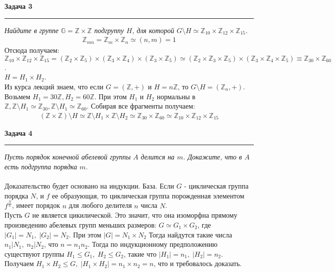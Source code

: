 \documentclass[a4paper,11pt]{article}
\begin{document}
\textbf{\large Задача 3}
\medskip\hrule\medskip
\textit{Найдите в группе $ \mathbb{G} = \mathbb{Z} \times \mathbb{Z} $ подгруппу $ H $, для которой $ G \setminus H \simeq \mathbb{Z}_{10} \times \mathbb{Z}_{12} \times \mathbb{Z}_{15} $.} \\
\begin{gather*}
\mathbb{Z}_{mn} = \mathbb{Z}_{m} \times \mathbb{Z}_{n} \simeq (n, m) = 1
\end{gather*}
Отсюда получаем: $ \mathbb{Z}_{10} \times \mathbb{Z}_{12} \times \mathbb{Z}_{15} = (\mathbb{Z}_{2} \times \mathbb{Z}_{5}) \times (\mathbb{Z}_{3} \times \mathbb{Z}_{4}) \times (\mathbb{Z}_{3} \times \mathbb{Z}_{5}) \simeq (\mathbb{Z}_{2} \times \mathbb{Z}_{3} \times \mathbb{Z}_{5}) \times (\mathbb{Z}_{3} \times \mathbb{Z}_{4} \times \mathbb{Z}_{5}) \equiv \mathbb{Z}_{30} \times \mathbb{Z}_{60} $.   \\[2pt]
$ H = H_1 \times H_2 $. \\[2pt]
Из курса лекций знаем, что если $ G = (\mathbb{Z}, +) $ и $ H = n\mathbb{Z} $, то  $ G \setminus H = (\mathbb{Z}_n, +)$. \\[2pt]
Возьмем $ H_1 = 30\mathbb{Z}, H_2 = 60\mathbb{Z} $. При этом $ H_1 $ и $ H_2 $ нормальны в $ \mathbb{Z}, \mathbb{Z} \setminus H_1 \simeq \mathbb{Z}_{30}, \mathbb{Z} \setminus H_1 \simeq \mathbb{Z}_{60} $.
Собирая все фрагменты получаем:
\begin{gather*}
(\mathbb{Z} \times \mathbb{Z}) \setminus H \simeq  \mathbb{Z} \setminus H_1 \times \mathbb{Z} \setminus H_2 \simeq \mathbb{Z}_{30} \times \mathbb{Z}_{60} \simeq \mathbb{Z}_{10} \times \mathbb{Z}_{12} \times \mathbb{Z}_{15}
\end{gather*}
\newpage







\textbf{\large Задача 4}
\medskip\hrule\medskip
\textit{Пусть порядок конечной абелевой группы $ A $ делится на $ m $. Докажите, что в $ A $ есть подгруппа порядка $ m $.} \\ \\ 
Доказательство будет основано на индукции. База. Если $ G $ - циклическая группа порядка $ N $, и $ f $
ее образующая, то циклическая группа порожденная элементом $ f^{\frac{N}{n}} $, имеет порядок $ n $ для любого делителя $ n $ числа $ N $.   \\[2pt]
Пусть $ G $ не является цикилической. Это значит, что она изоморфна прямому произведению абелевых групп меньших размеров: $ G \simeq G_1 \times G_2 $, где $ |G_1| = N_1, \; |G_2| = N_2 $. При этом $ |G| = N_1 \times N_2 $ Тогда найдутся такие числа $ n_1 | N_1, \; n_2 | N_2 $, что $ n = n_1n_2 $. Тогда по индукционному предположению существуют группы $ H_1 \leq G_1, \; H_2 \leq G_2 $, такие что $ |H_1| = n_1, \; |H_2| = n_2 $. Получаем $ H_1 \times H_2 \leq G , \; |H_1 \times H_2| = n_1 \times n_2 = n$, что и требовалось доказать. 
\end{document}
